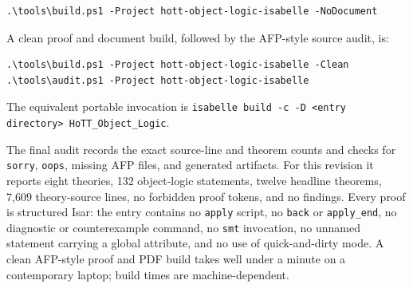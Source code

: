 \documentclass[11pt,a4paper]{article}
\begin{document}
{\small
\begin{verbatim}
.\tools\build.ps1 -Project hott-object-logic-isabelle -NoDocument
\end{verbatim}
}

A clean proof and document build, followed by the AFP-style source audit, is:

{\small
\begin{verbatim}
.\tools\build.ps1 -Project hott-object-logic-isabelle -Clean
.\tools\audit.ps1 -Project hott-object-logic-isabelle
\end{verbatim}
}

The equivalent portable invocation is
\texttt{isabelle build -c -D <entry directory> HoTT\_Object\_Logic}.

The final audit records the exact source-line and theorem counts and checks for
\texttt{sorry}, \texttt{oops}, missing AFP files, and generated artifacts. For
this revision it reports eight theories, 132 object-logic statements, twelve
headline theorems, 7,609 theory-source lines, no forbidden proof tokens, and no
findings. Every proof is structured Isar: the entry contains no \texttt{apply}
script, no \texttt{back} or \texttt{apply\_end}, no diagnostic or
counterexample command, no \texttt{smt} invocation, no unnamed statement
carrying a global attribute, and no use of quick-and-dirty mode. A clean
AFP-style proof and PDF build takes well under a minute on a contemporary
laptop; build times are machine-dependent.





\end{document}
